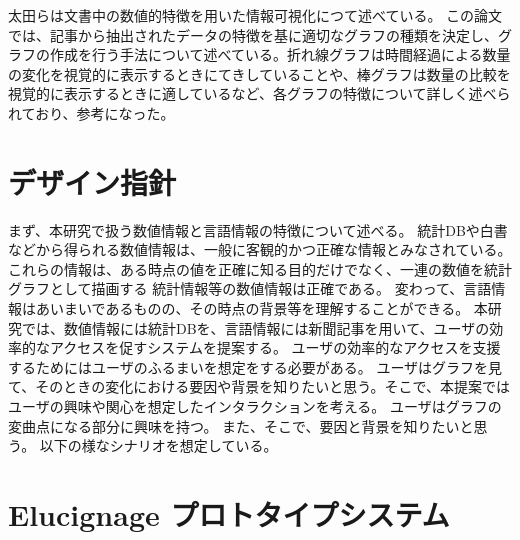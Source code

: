 \documentclass{matsushita-zemi}
\begin{document}
太田らは文書中の数値的特徴を用いた情報可視化につて述べている\cite{numerical_features}。
この論文では、記事から抽出されたデータの特徴を基に適切なグラフの種類を決定し、グラフの作成を行う手法について述べている。折れ線グラフは時間経過による数量の変化を視覚的に表示するときにてきしていることや、棒グラフは数量の比較を視覚的に表示するときに適しているなど、各グラフの特徴について詳しく述べられており、参考になった。

\section{デザイン指針}
まず、本研究で扱う数値情報と言語情報の特徴について述べる。
統計DBや白書などから得られる数値情報は、一般に客観的かつ正確な情報とみなされている。これらの情報は、ある時点の値を正確に知る目的だけでなく、一連の数値を統計グラフとして描画する
統計情報等の数値情報は正確である。
変わって、言語情報はあいまいであるものの、その時点の背景等を理解することができる。
本研究では、数値情報には統計DBを、言語情報には新聞記事を用いて、ユーザの効率的なアクセスを促すシステムを提案する。
ユーザの効率的なアクセスを支援するためにはユーザのふるまいを想定をする必要がある。
ユーザはグラフを見て、そのときの変化における要因や背景を知りたいと思う。そこで、本提案ではユーザの興味や関心を想定したインタラクションを考える。
ユーザはグラフの変曲点になる部分に興味を持つ。
また、そこで、要因と背景を知りたいと思う。
以下の様なシナリオを想定している。


\section{Elucignage プロトタイプシステム}
\end{document}

